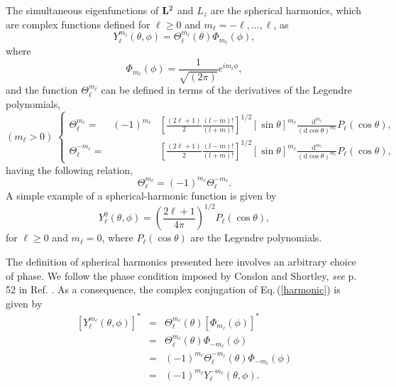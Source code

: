 \documentclass[]{interact}
\def\refe#1{{\color{blue}\textsf{Eq.}\,(\ref{#1})}}
\def\d{\mathrm{d}}
\renewcommand{\l}{\ell}
\begin{document}
The simultaneous eigenfunctions of ${\bf L}^2$ and $L_z$ are the spherical harmonics, which are complex functions defined for $\l\geq0$ and $m_\l=-\l,...,\l$, as
\begin{equation}
\label{harmonic}
 Y_{\l}^{m_\l}(\theta,\phi) = \Theta_\l^{m_\l}(\theta)\Phi_{m_\l}(\phi),
\end{equation}
where 
\begin{equation}
 \Phi_{m_\l}(\phi) = \frac{1}{\sqrt{(2\pi)}}e^{im_\l\phi}, 
\end{equation}
and the function $\Theta_\l^{m_\l}$ can be defined in terms of the derivatives of the Legendre polynomials, 
\begin{equation}
 (m_\l>0)\;\left\{\begin{array}{ccc} \Theta_\l^{m_\l} = & (-1)^{m_\l} & \left[\frac{(2\l+1)}{2}\frac{(l-m)!}{(l+m)!}\right]^{1/2}[\sin\theta]^{m_\l}\frac{\d^{m_\l}}{(\d\cos\theta)^{m_\l}}P_\l(\cos\theta), \\ \Theta_\l^{-m_\l}  = & &  \left[\frac{(2\l+1)}{2}\frac{(l-m)!}{(l+m)!}\right]^{1/2}[\sin\theta]^{m_\l}\frac{\d^{m_\l}}{(\d\cos\theta)^{m_\l}}P_\l(\cos\theta),\end{array}\right. 
\end{equation}
having the following relation,
\begin{equation}
\label{phase}
 \Theta_\l^{m_\l} = (-1)^{m_\l}\Theta_\l^{-m_\l}.
\end{equation}
A simple example of a spherical-harmonic function is given by $$Y_{\l}^{0}(\theta,\phi) = \left(\frac{2\l+1}{4\pi}\right)^{1/2} P_\l(\cos\theta),$$
for $\l\geq0$ and $m_\l=0$, where $P_\l(\cos\theta)$ are the Legendre polynomials.

The definition of spherical harmonics presented here involves an arbitrary choice of phase. We follow the phase condition imposed by Condon and Shortley, \emph{see} p. 52 in Ref. \cite{Condon}. As a consequence, the complex conjugation of  \refe{harmonic} is given by
\begin{equation}
 \begin{array}{rrl}
  [Y_{\l}^{m_\l}(\theta,\phi)]^* &=&\Theta_\l^{m_\l}(\theta)[\Phi_{m_\l}(\phi)]^*\\
                    &=&\Theta_\l^{m_\l}(\theta)\Phi_{-m_\l}(\phi)\\
                    &=&(-1)^{m_\l}\Theta_\l^{-m_\l}(\theta)\Phi_{-m_\l}(\phi)\\
                    &=&(-1)^{m_\l}Y_{\l}^{-m_\l}(\theta,\phi).
 \end{array}
\end{equation}
\end{document}
